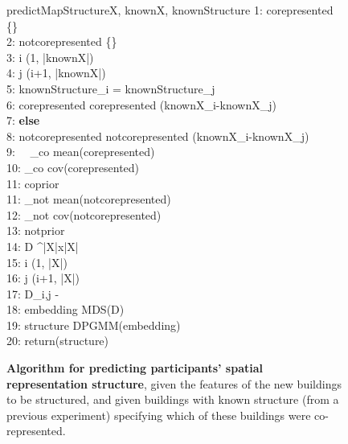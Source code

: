 \begin{figure}[h]
	\begin{pseudocode}{predictMapStructure}{X, knownX, knownStructure}
		1: corepresented \GETS \{\} \\
		2: notcorepresented \GETS \{\} \\
		3: \FOR i \in (1, |knownX|) \\
		4: \quad \FOR j \in (i+1, |knownX|) \\
		5: \quad \quad \IF knownStructure_i = knownStructure_j \\
		6: \quad \quad \quad corepresented \GETS corepresented \cup (knownX_i-knownX_j) \\
		7: \quad \quad \textbf{else} \\
		8: \quad \quad \quad notcorepresented \GETS notcorepresented \cup (knownX_i-knownX_j) \\
		9: \ \ \mu_{co} \GETS mean(corepresented) \\
		10: \Sigma_{co} \GETS cov(corepresented) \\
		11: coprior \GETS {} \\
		11: \mu_{not} \GETS mean(notcorepresented) \\
		12: \Sigma_{not} \GETS cov(notcorepresented) \\
		13: notprior \GETS {} \\
		14: D \in {}^{|X|x|X|} \\
		15: \FOR i \in (1, |X|) \\
		16: \quad \FOR j \in (i+1, |X|) \\
		17: \quad \quad D_{i,j}  -  \\
		18: embedding \GETS MDS(D) \\
		19: structure \GETS DPGMM(embedding) \\
		20: return(structure)
	\end{pseudocode}
	\caption[Algorithm for predicting spatial representation structure]{\textbf{Algorithm for predicting participants' spatial representation structure}, given the features of the new buildings to be structured, and given buildings with known structure (from a previous experiment) specifying which of these buildings were co-represented.}
	\label{fig:structalg}
\end{figure}


